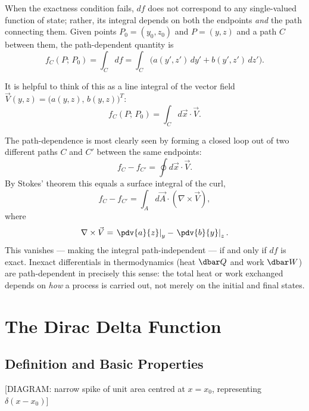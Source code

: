 When the exactness condition fails, $df$ does not correspond to any single-valued function of state; rather, its integral depends on both the endpoints \emph{and} the path connecting them. Given points $P_0 = (y_0, z_0)$ and $P = (y, z)$ and a path $C$ between them, the path-dependent quantity is
\begin{equation}
    f_C(P;\,P_0) = \int_C df = \int_C \bigl(a(y',z')\,dy' + b(y',z')\,dz'\bigr).
\end{equation}

It is helpful to think of this as a line integral of the vector field $\vec{V}(y,z) = \bigl(a(y,z),\, b(y,z)\bigr)^T$:
\begin{equation}
    f_C(P;\,P_0) = \int_C d\vec{x}\cdot\vec{V}.
\end{equation}

The path-dependence is most clearly seen by forming a closed loop out of two different paths $C$ and $C'$ between the same endpoints:
\begin{equation}
    f_C - f_{C'} = \oint d\vec{x}\cdot\vec{V}.
\end{equation}
By Stokes' theorem this equals a surface integral of the curl,
\begin{equation}
    f_C - f_{C'} = \int_A d\vec{A}\cdot(\nabla\times\vec{V}),
\end{equation}
where
\begin{equation}
    \nabla\times\vec{V} = \left.\pdv{a}{z}\right|_y - \left.\pdv{b}{y}\right|_z.
\end{equation}
This vanishes — making the integral path-independent — if and only if $df$ is exact. Inexact differentials in thermodynamics (heat $\dbar Q$ and work $\dbar W$) are path-dependent in precisely this sense: the total heat or work exchanged depends on \emph{how} a process is carried out, not merely on the initial and final states.

\chapter{The Dirac Delta Function}

\section{Definition and Basic Properties}

\begin{center}[DIAGRAM: narrow spike of unit area centred at $x = x_0$, representing $\delta(x - x_0)$]\end{center}

